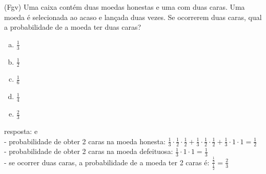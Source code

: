 \begin{ex}
 	(Fgv) Uma caixa contém duas moedas honestas e uma com duas caras. Uma moeda é selecionada ao acaso e lançada duas vezes. Se ocorrerem duas caras, qual a probabilidade de a moeda ter duas caras?
    \begin{enumerate}[(a)]
    \item $\frac{1}{3}$
    \item $\frac{1}{2}$
    \item $\frac{1}{6}$
    \item $\frac{1}{4}$
    \item $\frac{2}{3}$
    \end{enumerate}
       \begin{sol}
         resposta: e \\
         - probabilidade de obter 2 caras na moeda honesta: 
         $\frac{1}{3}\cdot\frac{1}{2}\cdot\frac{1}{2}+\frac{1}{3}\cdot\frac{1}{2}\cdot\frac{1}{2}+\frac{1}{3}\cdot1\cdot1=\frac{1}{2}$ \\
         - probabilidade de obter 2 caras na moeda defeituosa: $\frac{1}{3}\cdot1\cdot1=\frac{1}{3}$ \\
         - se ocorrer duas caras, a probabilidade de a moeda ter 2 caras é: $\frac{\frac{1}{3}}{\frac{1}{2}}=\frac{2}{3}$
       \end{sol}
\end{ex}